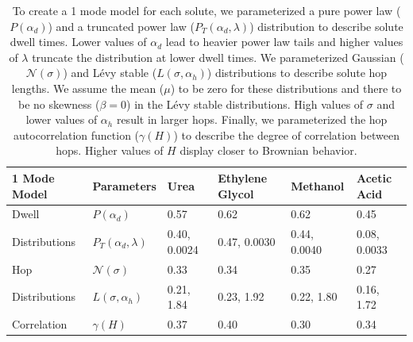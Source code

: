 \documentclass{article}
\begin{document}
  \begin{table}[h]
  \centering
  \begin{tabular}{|M{2cm}|M{1.65cm}|M{1.95cm}|M{1.95cm}|M{1.95cm}|M{1.95cm}|}
   Mode Model  & Parameters                & Urea         & Ethylene Glycol &   Methanol   & Acetic Acid  \\\hline
  Dwell         & $P(\alpha_d)$             & 0.57         & 0.62            & 0.62         & 0.45         \\
  Distributions & $P_T(\alpha_d, \lambda)$  & 0.40, 0.0024 & 0.47, 0.0030    & 0.44, 0.0040 & 0.08, 0.0033 \\\hline
  Hop           & $\mathcal{N}(\sigma)$     & 0.33         & 0.34            & 0.35         & 0.27         \\
  Distributions & $L(\sigma, \alpha_h)$     & 0.21, 1.84   & 0.23, 1.92      & 0.22, 1.80   & 0.16, 1.72   \\\hline
  Correlation   & $\gamma(H)$               & 0.37         & 0.40            & 0.30         & 0.34         \\
  \hline 
  \end{tabular}
  \caption{To create a 1 mode model for each solute, we parameterized a pure power
  law ($P(\alpha_d)$) and a truncated power law ($P_T(\alpha_d, \lambda)$) distribution 
  to describe solute dwell times. Lower values of $\alpha_d$ lead to heavier power 
  law tails and higher values of $\lambda$ truncate the distribution at lower
  dwell times. We parameterized Gaussian ($\mathcal{N}(\sigma)$) and L\'evy stable 
  ($L(\sigma, \alpha_h)$) distributions to describe solute hop lengths. We assume
  the mean ($\mu$) to be zero for these distributions and there to be no skewness ($\beta=0$)
  in the L\'evy stable distributions. High values of $\sigma$ and lower values of
  $\alpha_h$ result in larger hops. Finally, we parameterized the hop autocorrelation
  function ($\gamma(H)$) to describe the degree of correlation between hops. 
  Higher values of $H$ display closer to Brownian behavior.}\label{table:sfbm_params}
  \end{table}
  
\end{document}

